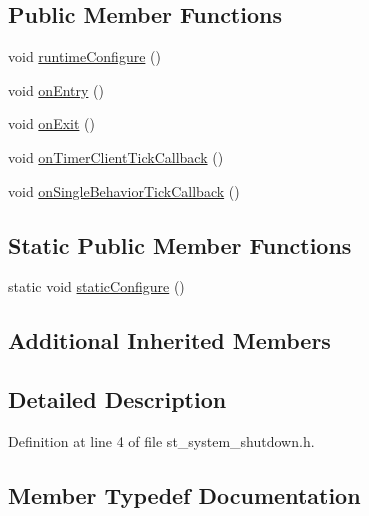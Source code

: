 \subsection*{Public Member Functions}
\begin{DoxyCompactItemize}
\item 
void \hyperlink{structsm__respira__1_1_1StSystemShutdown_a0e64b317e2720facbfeabc99956bf071}{runtime\+Configure} ()
\item 
void \hyperlink{structsm__respira__1_1_1StSystemShutdown_a1a1c466be4f427b79e0276ab7f38344a}{on\+Entry} ()
\item 
void \hyperlink{structsm__respira__1_1_1StSystemShutdown_adc045e262e894feb5f040f9d3e98764a}{on\+Exit} ()
\item 
void \hyperlink{structsm__respira__1_1_1StSystemShutdown_a4c113d1875fb5a538c45973b87900ff6}{on\+Timer\+Client\+Tick\+Callback} ()
\item 
void \hyperlink{structsm__respira__1_1_1StSystemShutdown_af0466e4c8c2527eeb76888d8dfec396c}{on\+Single\+Behavior\+Tick\+Callback} ()
\end{DoxyCompactItemize}
\subsection*{Static Public Member Functions}
\begin{DoxyCompactItemize}
\item 
static void \hyperlink{structsm__respira__1_1_1StSystemShutdown_a3e55c52ddc658248bf37a7c7dc353a44}{static\+Configure} ()
\end{DoxyCompactItemize}
\subsection*{Additional Inherited Members}


\subsection{Detailed Description}


Definition at line 4 of file st\+\_\+system\+\_\+shutdown.\+h.



\subsection{Member Typedef Documentation}
\mbox{\label{structsm__respira__1_1_1StSystemShutdown_ae6fd4a2dbf4f3a8aa45f21074254a24e}} 
